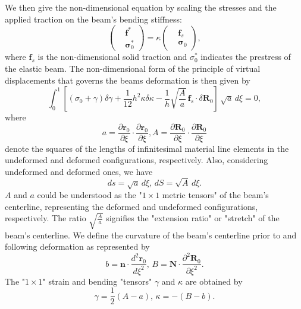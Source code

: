 \documentclass[a4paper,12pt]{report}
\begin{document}
We then give the non-dimensional equation by scaling the stresses and the applied traction on the beam's bending stiffness:
\begin{equation}
	\label{eqn:30}
	\left(\begin{aligned}
		&\mathbf{f^*} \\
		&\mathbf{\sigma}_0^*
	\end{aligned}\right)
	=\kappa\left(\begin{aligned}
		&\mathbf{f}_{s} \\
		&\mathbf{\sigma}_0
	\end{aligned}\right),
\end{equation}
where $\mathbf{f}_{s}$ is the non-dimensional solid traction and $\sigma^*_0$ indicates the prestress of the elastic beam.
The non-dimensional form of the principle of virtual displacements that governs the beams deformation is then given by
\begin{equation}
	\label{eqn:31}
	\int^1_0 \left[(\sigma_0+\gamma)\delta\gamma+\frac{1}{12}h^2\kappa\delta\kappa-\frac{1}{h}\sqrt{\frac{A}{a}}\,\mathbf{f}_{s}\cdot \delta \mathbf{R}_0
	\right]\,\sqrt{a}\,d\xi=0,
\end{equation}
where 
\begin{equation}
	\label{eqn:32} a=\frac{\partial\mathbf{r}_0}{\partial\xi}\cdot\frac{\partial\mathbf{r}_0}{\partial\xi}, A=\frac{\partial\mathbf{R}_0}{\partial\xi}\cdot\frac{\partial\mathbf{R}_0}{\partial\xi}
\end{equation}
denote the squares of the lengths of infinitesimal material line elements in the undeformed and deformed configurations, respectively.
Also, considering undeformed and deformed ones, we have 
\begin{equation}
	\label{eqn:33}
	ds=\sqrt{a}\,d\xi,\,dS=\sqrt{A}\,d\xi.
\end{equation}
$A$ and $a$ could be understood as the "$1\times1$ metric tensors" of the beam's centerline, representing the deformed and undeformed configurations, respectively. 
The ratio $\sqrt{\frac{A}{a}}$ signifies the "extension ratio" or "stretch" of the beam's centerline. We define the curvature of the beam's centerline prior to and following deformation as represented by 
\begin{equation}
	\label{eqn:34}
	b=\mathbf{n}\cdot\frac{d^2\mathbf{r}_0}{d\xi^2},\,B=\mathbf{N}\cdot\frac{\partial^2\mathbf{R}_0}{\partial\xi^2}.
\end{equation}
The "$1\times1$" strain and bending "tensors" $\gamma$ and $\kappa$ are obtained by
\begin{equation}
	\label{eqn:35}
	\gamma=\frac{1}{2}(A-a),\,\kappa=-(B-b).
\end{equation}
\end{document}

